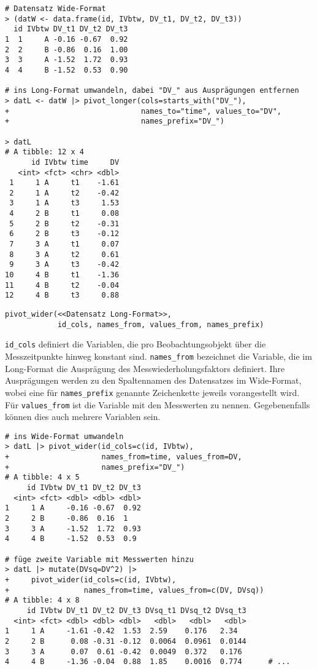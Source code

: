 \begin{lstlisting}
# Datensatz Wide-Format
> (datW <- data.frame(id, IVbtw, DV_t1, DV_t2, DV_t3))
  id IVbtw DV_t1 DV_t2 DV_t3
1  1     A -0.16 -0.67  0.92
2  2     B -0.86  0.16  1.00
3  3     A -1.52  1.72  0.93
4  4     B -1.52  0.53  0.90

# ins Long-Format umwandeln, dabei "DV_" aus Ausprägungen entfernen
> datL <- datW |> pivot_longer(cols=starts_with("DV_"),
+                              names_to="time", values_to="DV",
+                              names_prefix="DV_")

> datL
# A tibble: 12 x 4
      id IVbtw time     DV
   <int> <fct> <chr> <dbl>
 1     1 A     t1    -1.61
 2     1 A     t2    -0.42
 3     1 A     t3     1.53
 4     2 B     t1     0.08
 5     2 B     t2    -0.31
 6     2 B     t3    -0.12
 7     3 A     t1     0.07
 8     3 A     t2     0.61
 9     3 A     t3    -0.42
10     4 B     t1    -1.36
11     4 B     t2    -0.04
12     4 B     t3     0.88
\end{lstlisting}

\begin{lstlisting}
pivot_wider(<<Datensatz Long-Format>>,
            id_cols, names_from, values_from, names_prefix)
\end{lstlisting}

\lstinline!id_cols! definiert die Variablen, die pro Beobachtungsobjekt über die Messzeitpunkte hinweg konstant sind. \lstinline!names_from! bezeichnet die Variable, die im Long-Format die Ausprägung des Messwiederholungsfaktors definiert. Ihre Ausprägungen werden zu den Spaltennamen des Datensatzes im Wide-Format, wobei eine für \lstinline!names_prefix! genannte Zeichenkette jeweils vorangestellt wird. Für \lstinline!values_from! ist die Variable mit den Messwerten zu nennen. Gegebenenfalls können dies auch mehrere Variablen sein.
\begin{lstlisting}
# ins Wide-Format umwandeln
> datL |> pivot_wider(id_cols=c(id, IVbtw),
+                     names_from=time, values_from=DV,
+                     names_prefix="DV_")
# A tibble: 4 x 5
     id IVbtw DV_t1 DV_t2 DV_t3
  <int> <fct> <dbl> <dbl> <dbl>
1     1 A     -0.16 -0.67  0.92
2     2 B     -0.86  0.16  1   
3     3 A     -1.52  1.72  0.93
4     4 B     -1.52  0.53  0.9

# füge zweite Variable mit Messwerten hinzu
> datL |> mutate(DVsq=DV^2) |>
+     pivot_wider(id_cols=c(id, IVbtw),
+                 names_from=time, values_from=c(DV, DVsq))
# A tibble: 4 x 8
     id IVbtw DV_t1 DV_t2 DV_t3 DVsq_t1 DVsq_t2 DVsq_t3
  <int> <fct> <dbl> <dbl> <dbl>   <dbl>   <dbl>   <dbl>
1     1 A     -1.61 -0.42  1.53  2.59    0.176   2.34  
2     2 B      0.08 -0.31 -0.12  0.0064  0.0961  0.0144
3     3 A      0.07  0.61 -0.42  0.0049  0.372   0.176 
4     4 B     -1.36 -0.04  0.88  1.85    0.0016  0.774      # ...
\end{lstlisting}

